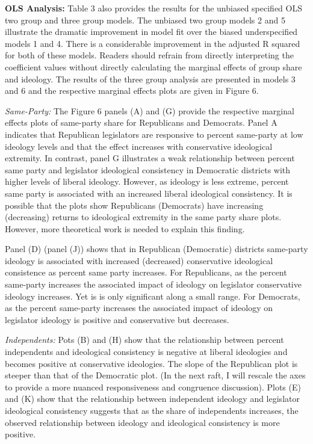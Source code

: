 \documentclass[10pt,letterpaper]{article}
\begin{document}
\textbf{OLS Analysis:} Table 3 also provides the results for the unbiased specified OLS two group and three group models. The unbiased two group models 2 and 5 illustrate the dramatic improvement in model fit over the biased underspecified models 1 and 4. There is a considerable improvement in the adjusted R squared for both of these models. Readers should refrain from directly interpreting the coefficient values without directly calculating the marginal effects of group share and ideology. The results of the three group analysis are presented in models 3 and 6 and the respective marginal effects plots are given in Figure 6.

\textit{Same-Party:} The Figure 6 panels (A) and (G) provide the respective marginal effects plots of same-party share for Republicans and Democrats. Panel A indicates that Republican legislators are responsive to percent same-party at low ideology levels and that the effect increases with conservative ideological extremity. In contrast, panel G illustrates a weak relationship between percent same party and legislator ideological consistency in Democratic districts with higher levels of liberal ideology. However, as ideology is less extreme, percent same party is associated with an increased liberal ideological consistency. It is possible that the plots show Republicans (Democrats) have increasing (decreasing) returns to ideological extremity in the same party share plots. However, more theoretical work is needed to explain this finding. 

Panel (D) (panel (J)) shows that in Republican (Democratic) districts same-party ideology is associated with increased (decreased) conservative ideological consistence as percent same party increases. For Republicans, as the percent same-party increases the associated impact of ideology on legislator conservative ideology increases. Yet is is only significant along a small range. For Democrats, as the percent same-party increases the associated impact of ideology on legislator ideology is positive and conservative but decreases.

\textit{Independents:} Pots (B) and (H) show that the relationship between percent independents and ideological consistency is negative at liberal ideologies and becomes positive at conservative ideologies. The slope of the Republican plot is steeper than that of the Democratic plot. (In the next raft, I will rescale the axes to provide a more nuanced responsiveness and congruence discussion). Plots (E) and (K) show that the relationship between independent ideology and legislator ideological consistency suggests that as the share of independents increases, the observed relationship between ideology and ideological consistency is more positive.
\end{document}
